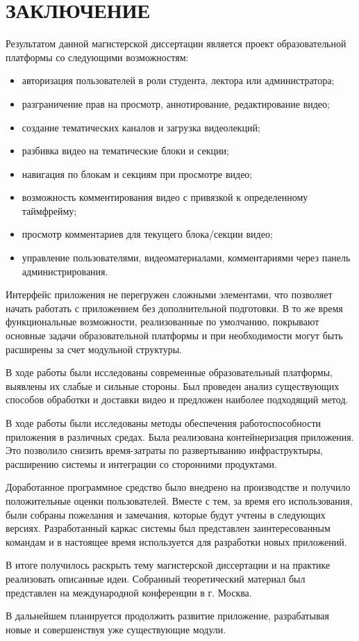 \section*{ЗАКЛЮЧЕНИЕ}

Результатом данной магистерской диссертации является проект образовательной платформы со следующими
возможностям:
\begin{itemize}[wide,topsep=0pt]
  \itemsep0em
  \item авторизация пользователей в роли студента, лектора или администратора;
  \item разграничение прав на просмотр, аннотирование, редактирование видео;
  \item создание тематических каналов и загрузка видеолекций;
  \item разбивка видео на тематические блоки и секции;
  \item навигация по блокам и секциям при просмотре видео;
  \item возможность комментирования видео с привязкой к определенному таймфрейму;
  \item просмотр комментариев для текущего блока/секции видео;
  \item управление пользователями, видеоматериалами, комментариями через панель администрирования.
\end{itemize}

Интерфейс приложения не перегружен сложными элементами, что позволяет начать работать
с приложением без дополнительной подготовки.
В то же время функциональные возможности, реализованные по умолчанию, покрывают основные
задачи образовательной платформы и при необходимости могут быть расширены за счет модульной
структуры.

В ходе работы были исследованы современные образовательный платформы,
выявлены их слабые и сильные стороны. Был проведен анализ существующих способов обработки
и доставки видео и предложен наиболее подходящий метод.

В ходе работы были исследованы методы обеспечения работоспособности приложения в различных
средах. Была реализована контейнеризация приложения. Это позволило снизить время-затраты
по развертыванию инфраструктыры, расширению системы и интеграции со сторонними
продуктами.

Доработанное программное средство было внедрено на производстве и получило положительные
оценки пользователей. Вместе с тем, за время его использования, были собраны
пожелания и замечания, которые будут учтены в следующих версиях.
Разработанный каркас системы был представлен заинтересованным командам и в настоящее
время используется для разработки новых приложений.

В итоге получилось раскрыть тему магистерской диссертации и на практике реализовать
описанные идеи. Собранный теоретический материал был представлен на международной
конференции в г. Москва.

В дальнейшем планируется продолжить развитие приложение, разрабатывая новые
и совершенствуя уже существующие модули.


